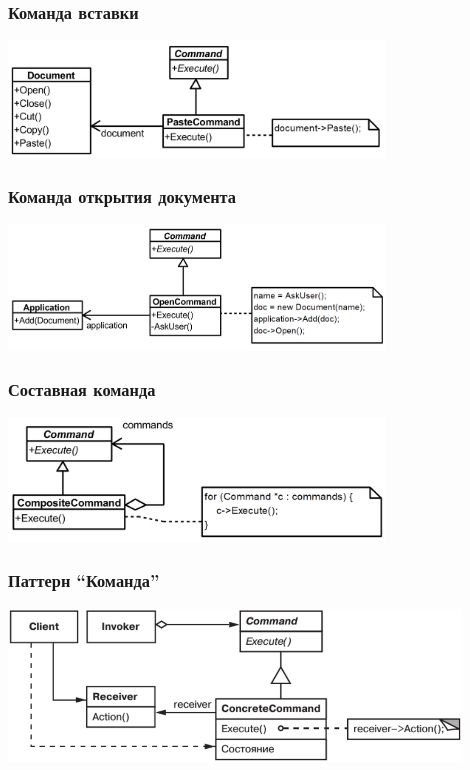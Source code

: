 \documentclass[xetex,mathserif,serif]{beamer}
\begin{document}
    \begin{frame}
        \frametitle{Команда вставки}
        \begin{center}
            \includegraphics[width=0.75\textwidth]{pasteCommand.png}
        \end{center}
    \end{frame}

    \begin{frame}
        \frametitle{Команда открытия документа}
        \begin{center}
            \includegraphics[width=0.75\textwidth]{openDocumentCommand.png}
        \end{center}
    \end{frame}

    \begin{frame}
        \frametitle{Составная команда}
        \begin{center}
            \includegraphics[width=0.75\textwidth]{compositeCommand.png}
        \end{center}
    \end{frame}

    \begin{frame}
        \frametitle{Паттерн ``Команда''}
        \begin{center}
            \includegraphics[width=0.9\textwidth]{command.png}
        \end{center}
    \end{frame}
\end{document}
